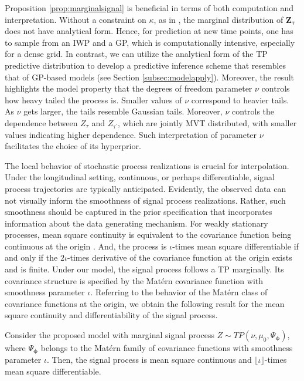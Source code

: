 Proposition \ref{prop:marginalsignal} is beneficial 
in terms of both computation and interpretation. Without a constraint on $\kappa$, as 
in \citet{Yang2016}, the marginal distribution of $\mathbf{Z}_{\boldsymbol{\tau}}$ does 
not have analytical form. Hence, for prediction at new time points, one has to sample 
from an IWP and a GP, which is computationally intensive, especially for a dense grid. 
In contrast, we can utilize the analytical form of the TP predictive distribution to 
develop a predictive inference scheme that resembles that of GP-based models
(see Section \ref{subsec:modelapply}). 
Moreover, the result highlights the model property that the degrees of freedom 
parameter $\nu$ controls how heavy tailed the process is. Smaller values of $\nu$ 
correspond to heavier tails. As $\nu$ gets larger, the tails resemble Gaussian tails. 
Moreover, $\nu$ controls the dependence between $Z_{\tau}$ and $Z_{\tau^{\prime}}$, 
which are jointly MVT distributed, with smaller values indicating higher dependence. 
Such interpretation of parameter $\nu$ facilitates the choice of its hyperprior. 


The local behavior of stochastic process realizations is crucial for interpolation. 
Under the longitudinal setting, continuous, or perhaps differentiable, signal process 
trajectories are typically anticipated. Evidently, the observed
data can not visually inform the smoothness of signal process realizations. Rather, 
such smoothness should be captured in the prior specification that incorporates 
information about the data generating mechanism. For weakly stationary processes, 
mean square continuity is equivalent to the covariance function being continuous at 
the origin \citep{Stein1999}. And, the process is $\iota$-times mean square differentiable 
if and only if the $2\iota$-times derivative of the covariance function at the origin 
exists and is finite. Under our model, the signal process follows a TP marginally. 
Its covariance structure is specified by the Matérn covariance function with smoothness 
parameter $\iota$. Referring to the behavior of the Matérn class of covariance functions 
at the origin, we obtain the following result for the mean square continuity and 
differentiability of the signal process.

\begin{proposition}
\label{prop:smoothsignal}
Consider the proposed model with marginal signal process 
$Z\sim TP(\nu,\mu_0,\Psi_{\boldsymbol{\phi}})$, where $\Psi_{\boldsymbol{\phi}}$ belongs to 
the Matérn family of covariance functions with smoothness parameter $\iota$. Then, 
the signal process is mean square continuous and $\lfloor\iota\rfloor$-times mean 
square differentiable.   
\end{proposition}

